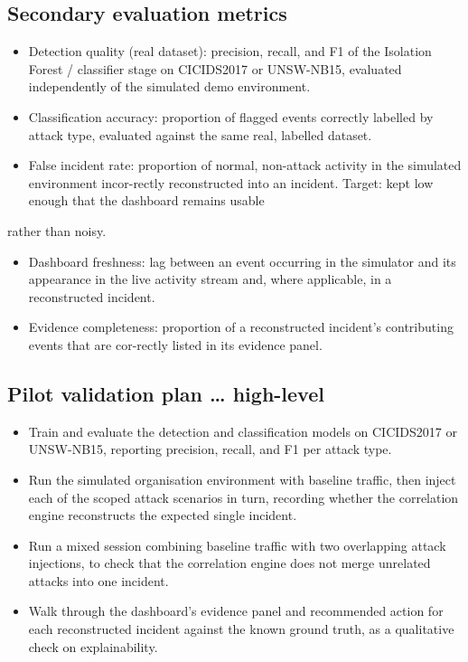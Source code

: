 \documentclass[12pt]{article}
\begin{document}
\subsection{Secondary evaluation metrics}

\begin{itemize}
  \item Detection quality (real dataset): precision, recall, and F1 of the Isolation Forest / classifier stage on CICIDS2017 or UNSW-NB15, evaluated independently of the simulated demo environment.
  \item Classification accuracy: proportion of flagged events correctly labelled by attack type, evaluated against the same real, labelled dataset.
  \item False incident rate: proportion of normal, non-attack activity in the simulated environment incor-rectly reconstructed into an incident. Target: kept low enough that the dashboard remains usable
\end{itemize}

rather than noisy.

\begin{itemize}
  \item Dashboard freshness: lag between an event occurring in the simulator and its appearance in the live activity stream and, where applicable, in a reconstructed incident.
  \item Evidence completeness: proportion of a reconstructed incident's contributing events that are cor-rectly listed in its evidence panel.
\end{itemize}

\subsection{Pilot validation plan \ldots{} high-level}

\begin{itemize}
  \item Train and evaluate the detection and classification models on CICIDS2017 or UNSW-NB15, reporting precision, recall, and F1 per attack type.
  \item Run the simulated organisation environment with baseline traffic, then inject each of the scoped attack scenarios in turn, recording whether the correlation engine reconstructs the expected single incident.
  \item Run a mixed session combining baseline traffic with two overlapping attack injections, to check that the correlation engine does not merge unrelated attacks into one incident.
  \item Walk through the dashboard's evidence panel and recommended action for each reconstructed incident against the known ground truth, as a qualitative check on explainability.
\end{itemize}
\end{document}
